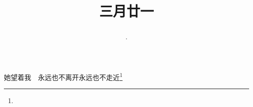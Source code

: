 \title{\date[d=29,m=4,y=2024][year:cn-y,年,month:cn,day:cn,日,·,weekday]·三月廿一 }
她望着我　永远也不离开永远也不走近\footnote{ }

